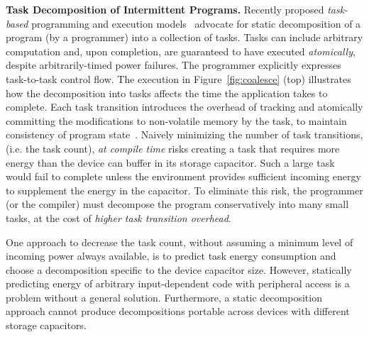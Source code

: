 \textbf{Task Decomposition of Intermittent Programs.} Recently proposed {\em
task-based} programming and execution models~\cite{alpaca,chain} advocate for
static decomposition of a program (by a programmer) into a collection of tasks.
Tasks can include arbitrary computation and, upon completion, are guaranteed to
have executed {\em atomically}, despite arbitrarily-timed power failures.
The programmer explicitly expresses task-to-task control flow. The execution
in Figure~\ref{fig:coalesce} (top) illustrates how the decomposition into
tasks affects the time the application takes to complete. Each task transition introduces the overhead of tracking and atomically committing the modifications to non-volatile memory by the task, to maintain consistency of program state~\cite{chain,alpaca}. Naively minimizing the number of task transitions, (i.e. the task count), \emph{at compile time} risks creating a task that requires more energy than the device can buffer in its storage capacitor. Such a large task would fail to complete unless the environment provides
sufficient incoming energy to supplement the energy in the capacitor. To eliminate this risk, the programmer (or the compiler) must decompose the program conservatively into many small tasks, at the cost of \emph{higher task transition overhead}.

One approach to decrease the task count, without assuming a minimum level of
incoming power always available, is to predict task energy consumption and
choose a decomposition specific to the device capacitor size. However, statically predicting energy of arbitrary input-dependent code with peripheral access is a problem without a general solution. Furthermore, a static decomposition approach cannot produce decompositions portable across devices with different storage capacitors.


